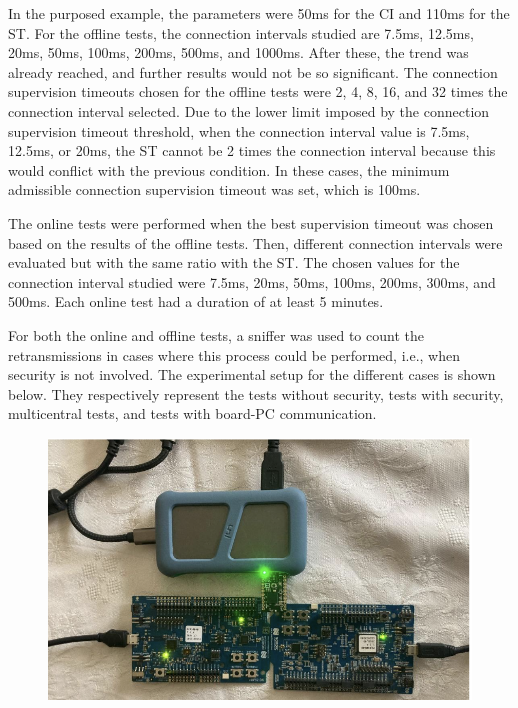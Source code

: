 \documentclass{Configuration_Files/PoliMi3i_thesis}
\begin{document}
In the purposed example, the parameters were 50ms for the CI and 110ms for the ST. For the offline tests, the connection intervals studied are 7.5ms, 12.5ms, 20ms, 50ms, 100ms, 200ms, 500ms, and 1000ms. After these, the trend was already reached, and further results would not be so significant. The connection supervision timeouts chosen for the offline tests were 2, 4, 8, 16, and 32 times the connection interval selected. Due to the lower limit imposed by the connection supervision timeout threshold, when the connection interval value is 7.5ms, 12.5ms, or 20ms, the ST cannot be 2 times the connection interval because this would conflict with the previous condition. In these cases, the minimum admissible connection supervision timeout was set, which is 100ms.

The online tests were performed when the best supervision timeout was chosen based on the results of the offline tests. Then, different connection intervals were evaluated but with the same ratio with the ST. The chosen values for the connection interval studied were 7.5ms, 20ms, 50ms, 100ms, 200ms, 300ms, and 500ms. Each online test had a duration of at least 5 minutes.

For both the online and offline tests, a sniffer was used to count the retransmissions in cases where this process could be performed, i.e., when security is not involved. The experimental setup for the different cases is shown below. They respectively represent the tests without security, tests with security, multicentral tests, and tests with board-PC communication.

\begin{figure}[h]
    \centering
    \includegraphics[scale=0.3]{Test_Procedure/4.png}
    \label{fig:ideal_tests_without_security}
\end{figure}
\end{document}
